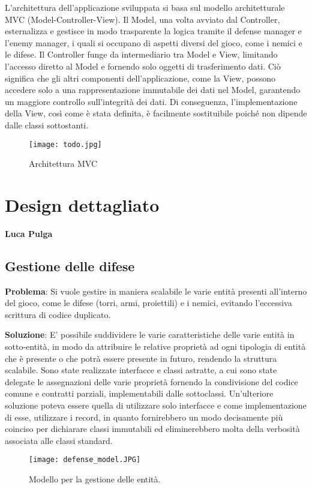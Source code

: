 \documentclass[a4paper,12pt]{report}
\begin{document}
L'architettura dell'applicazione sviluppata si basa sul modello architetturale MVC (Model-Controller-View). Il Model, una volta avviato dal Controller, esternalizza e gestisce in modo trasparente la logica tramite il defense manager e l'enemy manager, i quali si occupano di aspetti diversi del gioco, come i nemici e le difese. Il Controller funge da intermediario tra Model e View, limitando l'accesso diretto al Model e fornendo solo oggetti di trasferimento dati. Ciò significa che gli altri componenti dell'applicazione, come la View, possono accedere solo a una rappresentazione immutabile dei dati nel Model, garantendo un maggiore controllo sull'integrità dei dati. Di conseguenza, l'implementazione della View, così come è stata definita, è facilmente sostituibile poiché non dipende dalle classi sottostanti.
\begin{figure}
    \centering
    \texttt{[image: todo.jpg]}
    \caption{Architettura MVC}
    \label{fig:enter-label}
\end{figure}
\section{Design dettagliato}
\textbf{Luca Pulga}
\subsection{Gestione delle difese}

\textbf{Problema}:
Si vuole gestire in maniera scalabile le varie entità presenti all'interno del gioco, come le difese (torri, armi, proiettili) e i nemici, evitando l'eccessiva scrittura di codice duplicato.

\textbf{Soluzione}:
E' possibile suddividere le varie caratteristiche delle varie entità in sotto-entità, in modo da attribuire le relative proprietà ad ogni tipologia di entità che è presente
o che potrà essere presente in futuro, rendendo la struttura scalabile. Sono state realizzate interfacce e classi astratte, a cui sono state delegate le assegnazioni delle varie proprietà fornendo la condivisione del codice comune e contratti parziali, implementabili dalle sottoclassi.
Un'ulteriore soluzione poteva essere quella di utilizzare solo interfacce e come implementazione di esse, utilizzare i record, in quanto fornirebbero un modo decisamente più coinciso per dichiarare classi immutabili ed eliminerebbero molta della verbosità associata alle classi standard.

\begin{figure}[H]
    \centering
    \texttt{[image: defense\_model.JPG]}
    \caption{Modello per la gestione delle entità.}
    \label{fig:defense-model}
\end{figure}
\end{document}
